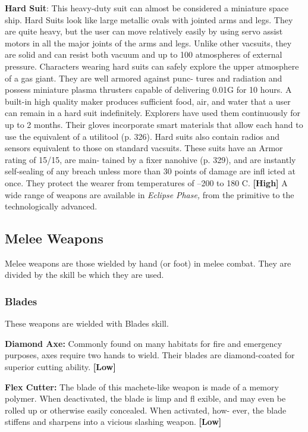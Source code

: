 \textbf{Hard Suit}: This heavy-duty suit can almost be 
considered a miniature space ship. Hard Suits look 
like large metallic ovals with jointed arms and legs. 
They are quite heavy, but the user can move relatively 
easily by using servo assist motors in all the major 
joints of the arms and legs. Unlike other vacsuits, they 
are solid and can resist both vacuum and up to 100 
atmospheres of external pressure. Characters wearing 
hard suits can safely explore the upper atmosphere 
of a gas giant. They are well armored against punc-
tures and radiation and possess miniature plasma 
thrusters capable of delivering 0.01G for 10 hours. A 
built-in high quality maker produces sufficient food, 
air, and water that a user can remain in a hard suit 
indefinitely. Explorers have used them continuously 
for up to 2 months. Their gloves incorporate smart 
materials that allow each hand to use the equivalent 
of a utilitool (p. 326). Hard suits also contain radios 
and sensors equivalent to those on standard vacsuits. 
These suits have an Armor rating of 15/15, are main-
tained by a fixer nanohive (p. 329), and are instantly 
self-sealing of any breach unless more than 30 points 
of damage are infl icted at once. They protect the 
wearer from temperatures of –200 to 180 C. \textbf{[High]}
A wide range of weapons are available in \textit{Eclipse }
\textit{Phase,} from the primitive to the technologically 
advanced.

\subsection{Melee Weapons}

Melee weapons are those wielded by hand (or foot) in 
melee combat. They are divided by the skill be which 
they are used.

\subsubsection{Blades}

These weapons are wielded with Blades skill.

\textbf{Diamond Axe:} Commonly found on many habitats 
for fire and emergency purposes, axes require two 
hands to wield. Their blades are diamond-coated for 
superior cutting ability. \textbf{[Low]}

\textbf{Flex Cutter:} The blade of this machete-like weapon 
is made of a memory polymer. When deactivated, the 
blade is limp and fl exible, and may even be rolled up 
or otherwise easily concealed. When activated, how-
ever, the blade stiffens and sharpens into a vicious 
slashing weapon. \textbf{[Low]}

